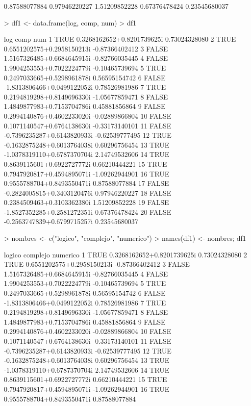 \documentclass{article}
\begin{document}
\begin{Schunk}
\begin{Soutput}
[16]  0.87588077884  0.97946220227  1.51209852228  0.67376478424  0.23545680037
\end{Soutput}
\begin{Sinput}
> df1 <- data.frame(log, comp, num)
> df1
\end{Sinput}
\begin{Soutput}
     log                        comp            num
1   TRUE  0.3268162652+0.8201739625i  0.73024328080
2   TRUE  0.6551202575+0.2958150213i -0.87366402412
3  FALSE  1.5167326485+0.6684645915i -0.82766035445
4  FALSE  1.9904253553+0.7022224779i -0.10465739694
5   TRUE  0.2497033665+0.5298961878i  0.56595154742
6  FALSE -1.8313806466+0.0499122052i  0.78526981986
7   TRUE  0.2194819298+0.8149696330i -1.05677859471
8  FALSE  1.4849877983+0.7153704786i  0.45881856864
9  FALSE  0.2994140876+0.4602233020i -0.02889866804
10 FALSE  0.1071140547+0.6764138630i -0.33173140101
11 FALSE -0.7396235287+0.6143820933i -0.62539777495
12  TRUE -0.1632875248+0.6013764038i  0.60296756454
13  TRUE -1.0378319110+0.6787370704i  2.14749532606
14  TRUE  0.8639115601+0.6922727772i  0.66210444221
15  TRUE  0.7947920817+0.4594895071i -1.09262944901
16  TRUE  0.9555788704+0.8493550471i  0.87588077884
17 FALSE -0.2824005815+0.3403120476i  0.97946220227
18 FALSE  0.2384509463+0.3103362380i  1.51209852228
19 FALSE -1.8527352285+0.2581272351i  0.67376478424
20 FALSE -0.2563747839+0.6799715257i  0.23545680037
\end{Soutput}
\begin{Sinput}
> nombres <- c("logico", "complejo", "numerico")
> names(df1) <- nombres; df1
\end{Sinput}
\begin{Soutput}
   logico                    complejo       numerico
1    TRUE  0.3268162652+0.8201739625i  0.73024328080
2    TRUE  0.6551202575+0.2958150213i -0.87366402412
3   FALSE  1.5167326485+0.6684645915i -0.82766035445
4   FALSE  1.9904253553+0.7022224779i -0.10465739694
5    TRUE  0.2497033665+0.5298961878i  0.56595154742
6   FALSE -1.8313806466+0.0499122052i  0.78526981986
7    TRUE  0.2194819298+0.8149696330i -1.05677859471
8   FALSE  1.4849877983+0.7153704786i  0.45881856864
9   FALSE  0.2994140876+0.4602233020i -0.02889866804
10  FALSE  0.1071140547+0.6764138630i -0.33173140101
11  FALSE -0.7396235287+0.6143820933i -0.62539777495
12   TRUE -0.1632875248+0.6013764038i  0.60296756454
13   TRUE -1.0378319110+0.6787370704i  2.14749532606
14   TRUE  0.8639115601+0.6922727772i  0.66210444221
15   TRUE  0.7947920817+0.4594895071i -1.09262944901
16   TRUE  0.9555788704+0.8493550471i  0.87588077884

\end{Soutput}
\end{Schunk}
\end{document}
